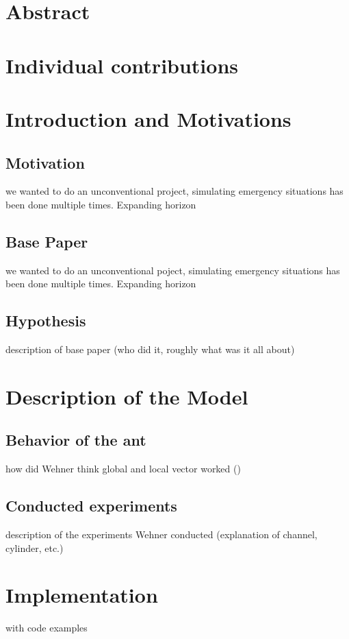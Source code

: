 \documentclass[11pt]{article}
\begin{document}
\section{Abstract}

\section{Individual contributions}

\section{Introduction and Motivations} %
	\subsection{Motivation}
		we wanted to do an unconventional project, simulating emergency situations has been done multiple times. Expanding horizon
	\subsection{Base Paper}
		we wanted to do an unconventional poject, simulating emergency situations has been done multiple times. Expanding horizon
	\subsection{Hypothesis}
		description of base paper (who did it, roughly what was it all about)
\section{Description of the Model} %
	\subsection{Behavior of the ant}
		how did Wehner think global and local vector worked (\cite{wehner})
	\subsection{Conducted experiments}
		description of the experiments Wehner conducted (explanation of channel, cylinder, etc.)
\section{Implementation} %
	with code examples
\end{document}
